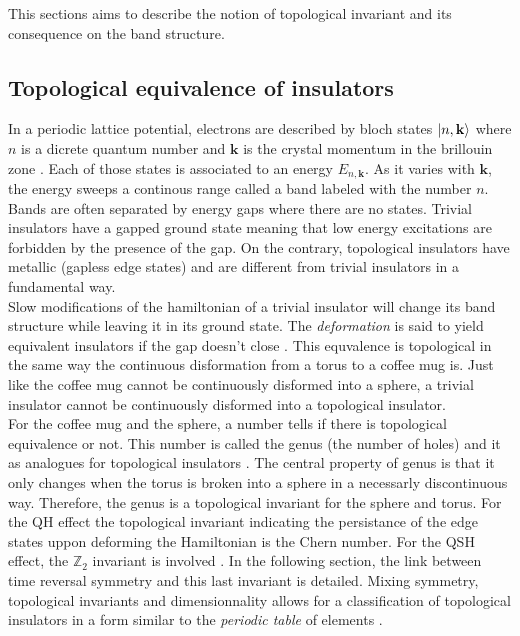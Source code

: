 This sections aims to describe the notion of topological invariant and its consequence on the band structure. 
\subsection{Topological equivalence of insulators}
In a periodic lattice potential, electrons are described by bloch states $\ket{n, \mathbf{k}}$ where $n$ is a dicrete quantum number and $\mathbf{k}$ is the crystal momentum in the brillouin zone \cite{shankar_topological_2018}. Each of those states is associated to an energy $E_{n, \mathbf{k}}$.  As it varies with $\mathbf{k}$, the energy sweeps a continous range called a band labeled with the number $n$. Bands are often separated by energy gaps where there are no states. Trivial insulators have a gapped ground state meaning that low energy excitations are forbidden by the presence of the gap. On the contrary, topological insulators have metallic (gapless edge states)\cite{kane_topological_2013} and are different from trivial insulators in a fundamental way.\\ 

Slow modifications of the hamiltonian of a trivial insulator will change its band structure while leaving it in its ground state. The \textit{deformation} is said to yield equivalent insulators if the gap doesn't close \cite{kane_topological_2013}. This equvalence is topological in the same way the continuous disformation from a torus to a coffee mug is. Just like the coffee mug cannot be continuously disformed into a sphere, a trivial insulator cannot be continuously disformed into a topological insulator.\\

For the coffee mug and the sphere, a number tells if there is topological equivalence or not. This number is called the genus (the number of holes) and it as analogues for topological insulators \cite{batra_physics_2020}. The central property of genus is that it only changes when the torus is broken into a sphere in a necessarly discontinuous way. Therefore, the genus is a topological invariant for the sphere and torus. For the QH effect the topological invariant indicating the persistance of the edge states uppon deforming the Hamiltonian is the Chern number. For the QSH effect, the $\mathbb{Z}_2$ invariant is involved \cite{kane_topological_2013}. In the following section, the link between time reversal symmetry and this last invariant is detailed.  Mixing symmetry, topological invariants and dimensionnality allows for a classification of topological insulators in a form similar to the \textit{periodic table} of elements \cite{hasan_topological_2010}. 

